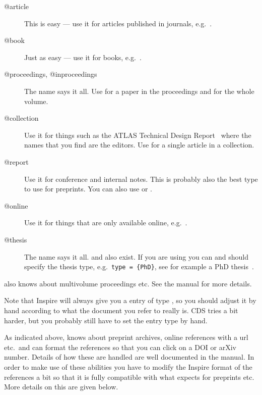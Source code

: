 \begin{description}
\item[@article] This is easy --- use it for articles published in
  journals, e.g.~\cite{Abramowicz:2010ih}.
\item[@book] Just as easy --- use it for books, e.g.~\cite{kopka04}.
\item[@proceedings, @inproceedings] The name says it all. Use
   for a paper in the proceedings and
   for the whole volume.
\item[@collection] Use it for things such as the ATLAS Technical Design
  Report~\cite{lhc:vol1} where the names that you find are the
  editors. Use  for a single article in a
  collection.
\item[@report] Use it for conference and
  internal notes. This is
  probably also the best type to use for preprints. You can also use
   or .
\item[@online] Use it for things that are only available online,
  e.g.~\cite{lshort}.
\item[@thesis] The name says it all.
    and
  also exist. If you are using  you can and should specify
  the thesis type, e.g.\ \texttt{type = \{PhD\}}, see for example a
  PhD thesis~\cite{tlodd:2012}.
\end{description}

 also knows about multivolume proceedings etc. See
the manual for more details.

Note that Inspire will always give you a \BibTeX{} entry of type
, so you should adjust it by hand according to what
the document you refer to really is. CDS tries a bit harder, but you
probably still have to set the entry type by hand.

As indicated above,  knows about preprint archives,
online references with a url etc.\ and can format the references so
that you can click on a DOI or arXiv number. Details of how these are
handled are well documented in the manual.  In order to make use of
these abilities you have to modify the Inspire format of the references
a bit so that it is fully compatible with what 
expects for preprints etc. More details on this are given below.


